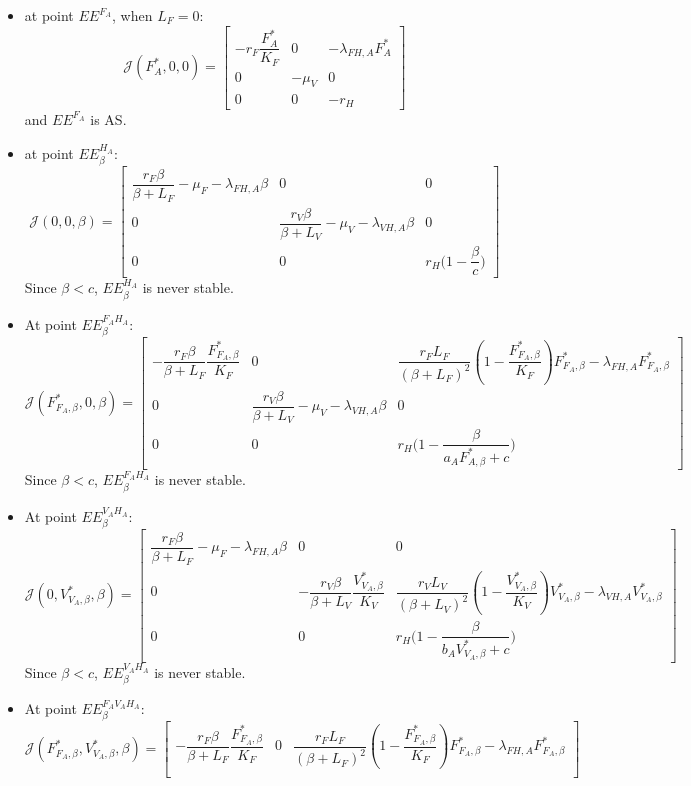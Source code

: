 \documentclass{article}
\newcommand{\lfa}{\lambda_{FH, A}}
\newcommand{\lva}{\lambda_{VH, A}}
\begin{document}
\begin{itemize}
\item at point $EE^{F_A}$, when $L_F = 0$:
\[
\mathcal{J}(F^*_A,0,0) = \begin{bmatrix}
- r_F \dfrac{F_A^*}{K_F} & 0 & -\lfa F^*_A \\ 0 &- \mu_V & 0 \\ 0 & 0 & -r_H
\end{bmatrix}
\]
and $EE^{F_A}$ is AS.
\item at point $EE^{H_A}_\beta$:
\[
\mathcal{J}(0,0,\beta) = \begin{bmatrix}
\dfrac{r_F \beta}{\beta + L_F} - \mu_F - \lfa \beta & 0 & 0 \\ 0 &\dfrac{r_V \beta}{\beta + L_V} - \mu_V - \lva \beta & 0 \\ 0 & 0 & r_H \Big(1-\dfrac{\beta}{c}\Big)
\end{bmatrix}
\]
Since $\beta < c$, $EE^{H_A}_\beta$ is never stable.
\item At point $EE^{F_AH_A}_\beta$:
\[
\mathcal{J}(F^*_{F_A, \beta},0,\beta) = \begin{bmatrix}
-\dfrac{r_F \beta}{\beta + L_F}\dfrac{F^*_{F_A, \beta}}{K_F} & 0 & \dfrac{r_F L_F}{(\beta+L_F)^2}\left(1-\dfrac{F^*_{F_A, \beta}}{K_F}\right)F^*_{F_A, \beta}  - \lfa F^*_{F_A, \beta} \\ 
0 &\dfrac{r_V \beta}{\beta + L_V} - \mu_V - \lva \beta & 0 \\ 
0 & 0 & r_H \Big(1-\dfrac{\beta}{a_AF^*_{A, \beta} + c}\Big)
\end{bmatrix}
\]
Since $\beta < c$, $EE^{F_AH_A}_\beta$ is never stable.
\item At point $EE^{V_AH_A}_\beta$:
\[
\mathcal{J}(0,V^*_{V_A, \beta},\beta) = \begin{bmatrix}
\dfrac{r_F \beta}{\beta + L_F} - \mu_F - \lfa \beta & 0 & 0\\
0 & -\dfrac{r_V \beta}{\beta + L_V}\dfrac{V^*_{V_A, \beta}}{K_V} & \dfrac{r_V L_V}{(\beta+L_V)^2}\left(1-\dfrac{V^*_{V_A, \beta}}{K_V}\right)V^*_{V_A, \beta}  - \lva V^*_{V_A, \beta} \\
0 & 0 & r_H \Big(1-\dfrac{\beta}{b_AV^*_{V_A, \beta} + c}\Big)
\end{bmatrix}
\]
Since $\beta < c$, $EE^{V_AH_A}_\beta$ is never stable.
\item At point $EE^{F_AV_AH_A}_\beta$:
\[
\mathcal{J}(F^*_{F_A, \beta},V^*_{V_A, \beta},\beta) = \begin{bmatrix}
-\dfrac{r_F \beta}{\beta + L_F}\dfrac{F^*_{F_A, \beta}}{K_F} & 0 & \dfrac{r_F L_F}{(\beta+L_F)^2}\left(1-\dfrac{F^*_{F_A, \beta}}{K_F}\right)F^*_{F_A, \beta}  - \lfa F^*_{F_A, \beta}\\

\end{bmatrix}\]
\end{itemize}
\end{document}
